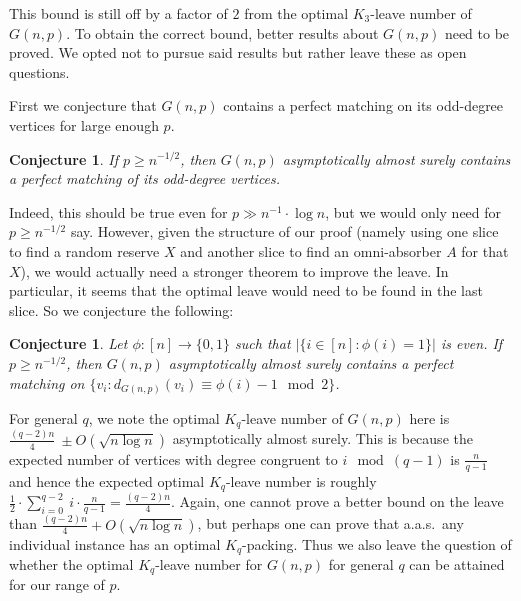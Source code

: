 \documentclass[11pt]{article}
\numberwithin{equation}{section}
\newcounter{i}
\theoremstyle{plain}
\newtheorem{conj}[thm]{Conjecture}
\theoremstyle{plain} %
\theoremstyle{definition}
\newcommand{\aas}{a.a.s.\ }
\begin{document}
This bound is still off by a factor of $2$ from the optimal $K_3$-leave number of $G(n,p)$. To obtain the correct bound, better results about $G(n,p)$ need to be proved. We opted not to pursue said results but rather leave these as open questions.

First we conjecture that $G(n,p)$ contains a perfect matching on its odd-degree vertices for large enough $p$.

\begin{conj}
If $p\ge n^{-1/2}$, then $G(n,p)$ asymptotically almost surely contains a perfect matching of its odd-degree vertices. 
\end{conj}

Indeed, this should be true even for $p \gg n^{-1}\cdot \log n$, but we would only need for $p\ge n^{-1/2}$ say. However, given the structure of our proof (namely using one slice to find a random reserve $X$ and another slice to find an omni-absorber $A$ for that $X$), we would actually need a stronger theorem to improve the leave. In particular, it seems that the optimal leave would need to be found in the last slice. So we conjecture the following:

\begin{conj}
Let $\phi:[n]\rightarrow \{0,1\}$ such that $|\{i\in [n]:\phi(i)=1\}|$ is even.  If $p\ge n^{-1/2}$, then $G(n,p)$ asymptotically almost surely contains a perfect matching on $\{ v_i: d_{G(n,p)}(v_i) \equiv \phi(i)-1 \mod 2\}$. 
\end{conj}



For general $q$, we note the optimal $K_q$-leave number of $G(n,p)$ here is $\frac{(q-2)n}{4}~\pm O(\sqrt{n \log n})$ asymptotically almost surely. This is because the expected number of vertices with degree congruent to $i \mod (q-1)$ is $\frac{n}{q-1}$ and hence the expected optimal $K_q$-leave number is roughly $\frac{1}{2} \cdot \sum_{i=0}^{q-2}~i\cdot \frac{n}{q-1} = \frac{(q-2)n}{4}$. Again, one cannot prove a better bound on the leave than $\frac{(q-2)n}{4} + O(\sqrt{n \log n})$, but perhaps one can prove that \aas any individual instance has an optimal $K_q$-packing. Thus we also leave the question of whether the optimal $K_q$-leave number for $G(n,p)$ for general $q$ can be attained for our range of $p$.
\end{document}
